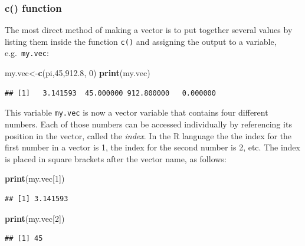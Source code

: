 \documentclass[
]{book}
\newenvironment{Shaded}{\begin{snugshade}}{\end{snugshade}}
\newcommand{\DecValTok}[1]{\textcolor[rgb]{0.00,0.00,0.81}{#1}}
\newcommand{\FloatTok}[1]{\textcolor[rgb]{0.00,0.00,0.81}{#1}}
\newcommand{\KeywordTok}[1]{\textcolor[rgb]{0.13,0.29,0.53}{\textbf{#1}}}
\newcommand{\NormalTok}[1]{#1}
\begin{document}
\hypertarget{c-function}{%
\subsubsection{c() function}\label{c-function}}

The most direct method of making a vector is to put together several values by listing them inside the function \texttt{c()} and assigning the output to a variable, e.g.~\texttt{my.vec}:

\begin{Shaded}
\begin{Highlighting}[]
\NormalTok{my.vec\textless{}{-}}\KeywordTok{c}\NormalTok{(pi,}\DecValTok{45}\NormalTok{,}\FloatTok{912.8}\NormalTok{, }\DecValTok{0}\NormalTok{)}
\KeywordTok{print}\NormalTok{(my.vec)}
\end{Highlighting}
\end{Shaded}

\begin{verbatim}
## [1]   3.141593  45.000000 912.800000   0.000000
\end{verbatim}

This variable \texttt{my.vec} is now a vector variable that contains four different numbers. Each of those numbers can be accessed individually by referencing its position in the vector, called the  \emph{index}. In the R language the the index for the first number in a vector is 1, the index for the second number is 2, etc. The index is placed in square brackets after the vector name, as follows:

\begin{Shaded}
\begin{Highlighting}[]
\KeywordTok{print}\NormalTok{(my.vec[}\DecValTok{1}\NormalTok{])}
\end{Highlighting}
\end{Shaded}

\begin{verbatim}
## [1] 3.141593
\end{verbatim}

\begin{Shaded}
\begin{Highlighting}[]
\KeywordTok{print}\NormalTok{(my.vec[}\DecValTok{2}\NormalTok{])}
\end{Highlighting}
\end{Shaded}

\begin{verbatim}
## [1] 45
\end{verbatim}
\end{document}
